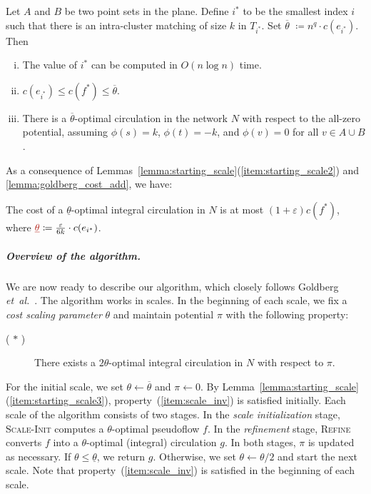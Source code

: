 \documentclass[a4paper,UKenglish]{socg-lipics-v2019}
\makeatletter
\def\etal{\emph{et~al.}}
\def\etal{\textit{et~al.}}
\def\eps{\varepsilon}
\def\fsupply{\phi}
\def\cost{c}
\theoremstyle{plain}
\numberwithin{figure}{section}
\renewcommand{\paragraph}{\subparagraph}
\def\EMPH#1{\textcolor{BrickRed}{{\emph{#1}}}}
\def\namedlabel#1#2{\begingroup
    #2%
    \def\@currentlabel{#2}%
    \phantomsection\label{#1}\endgroup
}
\makeatother
\begin{document}
\begin{lemma}
\label{lemma:starting_scale}
Let $A$ and $B$ be two point sets in the plane.
Define \EMPH{$i^*$} to be the smallest index $i$ such that there is an
intra-cluster matching of size $k$ in $T_{i^*}$.
Set \EMPH{$\overline{\theta}$} $\coloneqq n^q \cdot c(e_{i^*})$.
Then
\begin{enumerate}[(i)]
\item \label{item:starting_scale1}
	The value of $i^*$ can be computed in $O(n\log n)$ time.
\item \label{item:starting_scale2}
	$c(e_{i^*}) \leq \cost(f^*) \leq \overline{\theta}$.
\item \label{item:starting_scale3}
	There is a $\overline{\theta}$-optimal circulation in the network $N$ with
	respect to the all-zero potential, assuming $\fsupply(s) = k$,
	$\fsupply(t) = -k$, and $\fsupply(v) = 0$ for all $v \in A \cup B$.
\end{enumerate}
\end{lemma}

As a consequence of Lemmas~\ref{lemma:starting_scale}(\ref{item:starting_scale2})
and \ref{lemma:goldberg_cost_add}, we have:
%
\begin{corollary}
\label{corollary:goldberg_approx}
The cost of a $\underline{\theta}$-optimal integral circulation in $N$ is at
most $(1+\eps) \cost(f^*)$,
where $\EMPH{$\underline{\theta}$} \coloneqq \frac{\eps}{6k} \cdot c(e_{i^*})$.
\end{corollary}

\paragraph{Overview of the algorithm.}
We are now ready to describe our algorithm, which closely follows Goldberg \etal~\cite{GHKT17}.
The algorithm works in scales.
In the beginning of each scale, we fix a \EMPH{cost scaling parameter}
\EMPH{$\theta$} and maintain potential $\pi$ with the following property:

\begin{description}
\item[(\namedlabel{item:scale_inv}{$\ast$})]
	There exists a $2\theta$-optimal integral circulation in $N$ with respect to $\pi$.
\end{description}

For the initial scale, we set $\theta \gets \overline{\theta}$ and $\pi \gets 0$.
By Lemma~\ref{lemma:starting_scale}(\ref{item:starting_scale3}),
property~(\ref{item:scale_inv}) is satisfied initially.
Each scale of the algorithm consists of two stages.
In the \EMPH{scale initialization} stage, \textsc{Scale-Init}
computes a $\theta$-optimal pseudoflow $f$.
In the \EMPH{refinement} stage, \textsc{Refine} converts $f$ into
a $\theta$-optimal (integral) circulation $g$.
In both stages, $\pi$ is updated as necessary.
If $\theta \leq \underline{\theta}$, we return $g$.
Otherwise, we set $\theta \gets \theta/2$ and start the next scale.
Note that property~(\ref{item:scale_inv}) is satisfied in the beginning of each scale.
\end{document}

